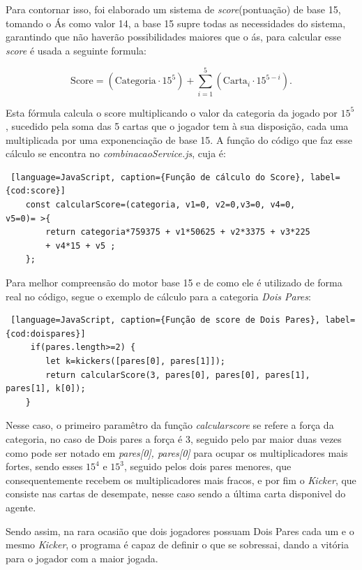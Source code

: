 Para contornar isso, foi elaborado um sistema de \textit{score}(pontuação) de base 15, tomando o Ás como valor 14, a base 15 supre todas as necessidades do sistema, garantindo que não haverão possibilidades maiores que o ás, para calcular esse \textit{score} é usada a seguinte formula:

$$\text{Score} = (\text{Categoria} \cdot 15^5) + \sum_{i=1}^{5} \left( \text{Carta}_i \cdot 15^{5-i} \right).$$

Esta fórmula calcula o score multiplicando o valor da categoria da jogado por $15^5$, sucedido pela soma das 5 cartas que o jogador tem à sua disposição, cada uma multiplicada por uma exponenciação de base 15.
A função do código que faz esse cálculo se encontra no \textit{combinacaoService.js}, cuja é:

\newpage
\begin{lstlisting} [language=JavaScript, caption={Função de cálculo do Score}, label={cod:score}]
    const calcularScore=(categoria, v1=0, v2=0,v3=0, v4=0,
v5=0)= >{
        return categoria*759375 + v1*50625 + v2*3375 + v3*225
        + v4*15 + v5 ;
    };
\end{lstlisting}

Para melhor compreensão do motor base 15 e de como ele é utilizado de forma real no código, segue o exemplo de cálculo para a categoria \textit{Dois Pares}:

\begin{lstlisting} [language=JavaScript, caption={Função de score de Dois Pares}, label={cod:doispares}]
     if(pares.length>=2) {
        let k=kickers([pares[0], pares[1]]);
        return calcularScore(3, pares[0], pares[0], pares[1], pares[1], k[0]);
    }
\end{lstlisting}

Nesse caso, o primeiro paramêtro da função \textit{calcularscore} se refere a força da categoria, no caso de Dois pares a força é 3, seguido pelo par maior duas vezes como pode ser notado em \textit{pares[0], pares[0]} para ocupar os multiplicadores mais fortes, sendo esses $15^4$ e $15^3$, seguido pelos dois pares menores, que consequentemente recebem os multiplicadores mais fracos, e por fim o \textit{Kicker}, que consiste nas cartas de desempate, nesse caso sendo a última carta disponivel do agente.

Sendo assim, na rara ocasião que dois jogadores possuam Dois Pares cada um e o mesmo \textit{Kicker}, o programa é capaz de definir o que se sobressai, dando a vitória para o jogador com a maior jogada.

